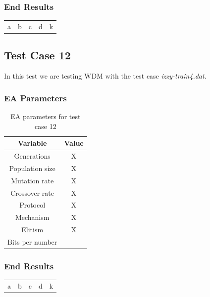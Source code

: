 \subsubsection{End Results}\label{sec:test-case-11-results}
\begin{table}
	\begin{tabular}{c c c c c}
		a & b & c & d & k \\
	\end{tabular}
\end{table}

\subsection{Test Case 12}\label{sec:test-case-12}
In this test we are testing WDM with the test case
\textit{izzy-train4.dat}.
\subsubsection{EA Parameters}\label{sec:test-case-12-parameters}
\begin{table}
	\begin{tabular}{c c}
		Variable & Value \\
		\hline
		Generations & X \\
		\hline
		Population size & X \\
		\hline
		Mutation rate & X \\
		\hline
		Crossover rate & X \\
		\hline
		Protocol & X \\
		\hline
		Mechanism & X \\
		\hline
		Elitism & X \\
		\hline
		Bits per number & \\
	\end{tabular}
	\caption{EA parameters for test case 12}
\end{table}
\subsubsection{End Results}\label{sec:test-case-12-results}
\begin{table}
	\begin{tabular}{c c c c c}
		a & b & c & d & k \\
	\end{tabular}
\end{table}
